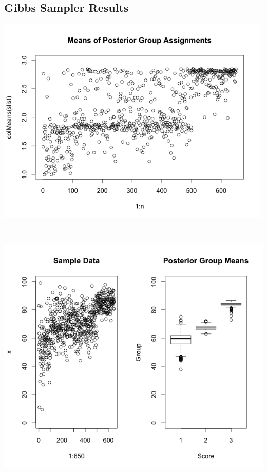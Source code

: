 \documentclass[12pt,letterpaper]{article}\usepackage[]{graphicx}\usepackage[]{color}
\begin{document}
\subsection{Gibbs Sampler Results}
\includegraphics[height=10cm]{scores-posterior-group-assignments.png}\\
\newpage
\includegraphics[height=14cm]{scores-sampledata-posteriormeans.png}\\
\end{document}
